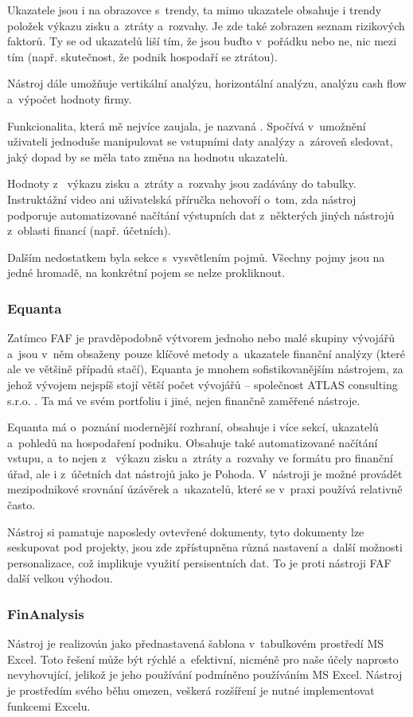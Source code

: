 Ukazatele jsou i na obrazovce s~trendy, ta mimo ukazatele obsahuje i trendy položek výkazu zisku a~ztráty a~rozvahy. Je zde také zobrazen seznam rizikových faktorů. Ty se od ukazatelů liší tím, že jsou buďto v~pořádku nebo ne, nic mezi tím (např. skutečnost, že podnik hospodaří se ztrátou).

Nástroj dále umožňuje vertikální analýzu, horizontální analýzu, analýzu cash flow a~výpočet hodnoty firmy.

Funkcionalita, která mě nejvíce zaujala, je nazvaná . Spočívá v~umožnění uživateli jednoduše manipulovat se vstupními daty analýzy a~zároveň sledovat, jaký dopad by se měla tato změna na hodnotu ukazatelů.

Hodnoty z~ výkazu zisku a~ztráty a~rozvahy jsou zadávány do tabulky. Instruktážní video ani uživatelská příručka nehovoří o~tom, zda nástroj podporuje automatizované načítání výstupních dat z~některých jiných nástrojů z~oblasti financí (např. účetních).

Dalším nedostatkem byla sekce s~vysvětlením pojmů. Všechny pojmy jsou na jedné hromadě, na konkrétní pojem se nelze prokliknout.


\subsubsection{Equanta}
Zatímco FAF je pravděpodobně výtvorem jednoho nebo malé skupiny vývojářů a~jsou v~něm obsaženy pouze klíčové metody a~ukazatele finanční analýzy (které ale ve většině případů stačí), Equanta je mnohem sofistikovanějším nástrojem, za jehož vývojem nejspíš stojí větší počet vývojářů -- společnost ATLAS consulting s.r.o. . Ta má ve svém portfoliu i jiné, nejen finančně zaměřené nástroje.

Equanta má o~poznání modernější rozhraní, obsahuje i více sekcí, ukazatelů a~pohledů na hospodaření podniku. Obsahuje také automatizované načítání vstupu, a~to nejen z~ výkazu zisku a~ztráty a~rozvahy ve formátu pro finanční úřad, ale i z~účetních dat nástrojů jako je Pohoda. V~nástroji je možné provádět mezipodnikové srovnání úzávěrek a~ukazatelů, které se v~praxi používá relativně často.

Nástroj si pamatuje naposledy ovtevřené dokumenty, tyto dokumenty lze seskupovat pod projekty, jsou zde zpřístupněna různá nastavení a~další možnosti personalizace, což implikuje využití persisentních dat. To je proti nástroji FAF další velkou výhodou. 


\subsubsection{FinAnalysis}
Nástroj je realizován jako přednastavená šablona v~tabulkovém prostředí MS Excel. Toto řešení může být rýchlé a~efektivní, nicméně pro naše účely naprosto nevyhovující, jelikož je jeho používání podmíněno používáním MS Excel. Nástroj je prostředím svého běhu omezen, veškerá rozšíření je nutné implementovat funkcemi Excelu.


